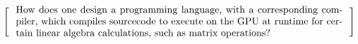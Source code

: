 \[
  \left[
  \begin{minipage}{\textwidth}
  \centering
  \begin{minipage}{0.96\textwidth}
  How does one design a programming language, with a corresponding compiler, which compiles sourcecode to execute on the GPU at runtime for certain linear algebra calculations, such as matrix operations?
  
  



  \end{minipage}
  \end{minipage}
    \right]
\]